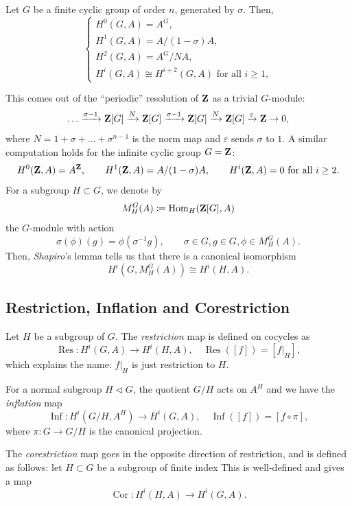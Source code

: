 \documentclass{article}
\begin{document}
\begin{thm}
	Let $G$ be a finite cyclic group of order $n$, generated by $\sigma$. Then,
	\[
		\begin{cases}
			H^0(G,A) = A^G,           \\[2pt]
			H^1(G,A) = A/(1-\sigma)A, \\[2pt]
			H^2(G,A) = A^G/NA,        \\[2pt]
			H^i(G,A) \cong H^{i+2}(G,A) \text{ for all } i\ge 1,
		\end{cases}
	\]
\end{thm}
This comes out of the ``periodic'' resolution of $\mathbf{Z}$ as a trivial $G$-module:
\[
	\ldots \xrightarrow{\sigma-1} \mathbf{Z}[G] \xrightarrow{N} \mathbf{Z}[G] \xrightarrow{\sigma-1} \mathbf{Z}[G] \xrightarrow{N} \mathbf{Z}[G] \xrightarrow{\varepsilon} \mathbf{Z} \to 0,
\]
where $N = 1+\sigma+\ldots+\sigma^{n-1}$ is the norm map and $\varepsilon$ sends $\sigma$ to $1$.
A similar computation holds for the infinite cyclic group $G=\mathbf{Z}$:
\[
	H^0(\mathbf{Z},A) = A^{\mathbf{Z}},\qquad H^1(\mathbf{Z},A) = A/(1-\sigma)A,\qquad H^i(\mathbf{Z},A) = 0 \text{ for all } i\ge 2.
\]
For a subgroup $H\subset G$, we denote by
\[M^G_H(A)\coloneqq  \operatorname{Hom}_H(\mathbf{Z}[G],A)\] the $G$-module with action
\[
	\sigma(\phi)(g) = \phi(\sigma^{-1}g),\qquad \sigma\in G, g\in G, \phi\in M^G_H(A).
\]
Then, \textit{Shapiro}'s lemma tells us that there is a canonical isomorphism
\begin{equation}\label{eq:shapiro}
	H^i(G,M^G_H(A)) \cong H^i(H,A).
\end{equation}

\subsection{Restriction, Inflation and Corestriction}

Let $H$ be a subgroup of $G$. The \emph{restriction} map is defined on cocycles as
\[
	\operatorname{Res}: H^i(G,A) \to H^i(H,A),\quad \operatorname{Res}([f]) = [f|_H],
\]
which explains the name: $f|_H$ is just restriction to $H$.

For a normal subgroup $H\triangleleft G$, the quotient $G/H$ acts on $A^H$ and we have the \emph{inflation} map
\[
	\operatorname{Inf}: H^i(G/H,A^H) \to H^i(G,A),\quad \operatorname{Inf}([f]) = [f\circ \pi],
\]
where $\pi:G\to G/H$ is the canonical projection.

The \emph{corestriction} map goes in the opposite direction of restriction, and is defined as follows: let $H\subset G$ be a subgroup of finite index 
This is well-defined and gives a map
\[
	\operatorname{Cor}: H^i(H,A) \to H^i(G,A).
\]
\end{document}
